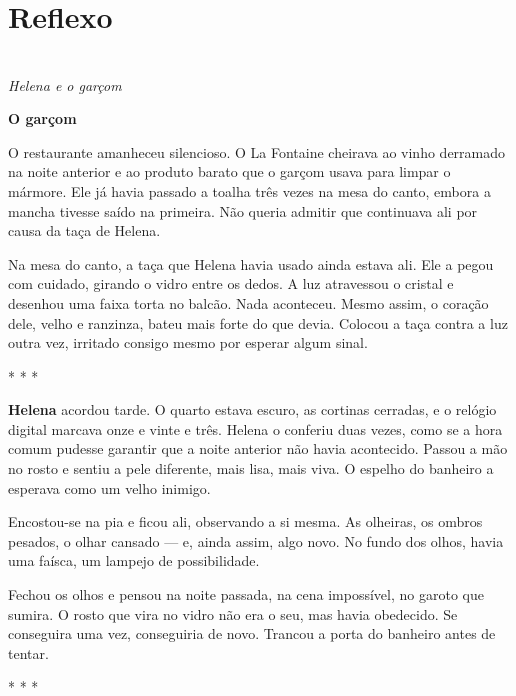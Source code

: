 \newpage

\ifdefined\useChapters
\chapter{Reflexo}
\else
\chapter{}
\fi

\begin{center}
\textit{Helena e o garçom}
\end{center}

\textbf{O garçom}

O restaurante amanheceu silencioso. O La Fontaine cheirava ao vinho derramado na noite anterior e ao produto barato que o garçom usava para limpar o mármore. Ele já havia passado a toalha três vezes na mesa do canto, embora a mancha tivesse saído na primeira. Não queria admitir que continuava ali por causa da taça de Helena.

Na mesa do canto, a taça que Helena havia usado ainda estava ali.  
Ele a pegou com cuidado, girando o vidro entre os dedos.  
A luz atravessou o cristal e desenhou uma faixa torta no balcão. Nada aconteceu. Mesmo assim, o coração dele, velho e ranzinza, bateu mais forte do que devia. Colocou a taça contra a luz outra vez, irritado consigo mesmo por esperar algum sinal.

\begin{center}
* * *
\end{center}

\textbf{Helena} acordou tarde.  
O quarto estava escuro, as cortinas cerradas, e o relógio digital marcava onze e vinte e três. Helena o conferiu duas vezes, como se a hora comum pudesse garantir que a noite anterior não havia acontecido.
Passou a mão no rosto e sentiu a pele diferente, mais lisa, mais viva.  
O espelho do banheiro a esperava como um velho inimigo.

Encostou-se na pia e ficou ali, observando a si mesma.  
As olheiras, os ombros pesados, o olhar cansado — e, ainda assim, algo novo.  
No fundo dos olhos, havia uma faísca, um lampejo de possibilidade.

Fechou os olhos e pensou na noite passada, na cena impossível, no garoto que sumira.  
O rosto que vira no vidro não era o seu, mas havia obedecido. Se conseguira uma vez, conseguiria de novo. Trancou a porta do banheiro antes de tentar.

\begin{center}
* * *
\end{center}

